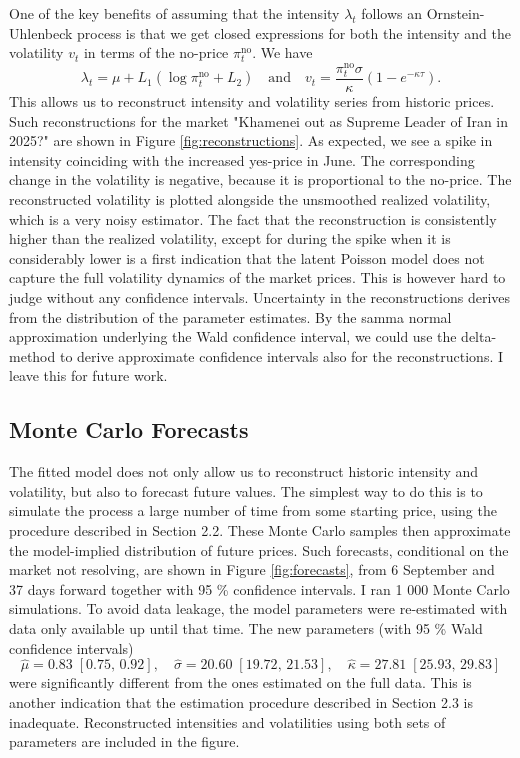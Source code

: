 \documentclass[a4paper, 12pt]{article}
\begin{document}
One of the key benefits of assuming that the intensity \(\lambda_t\) follows an Ornstein-Uhlenbeck process is that we get closed expressions for both the intensity and the volatility \(v_t\) in terms of the no-price \(\pi_t^\text{no}\). We have
\begin{equation*}
   \lambda_t = \mu + L_1(\log\pi_t^\text{no} + L_2)\quad\text{and}\quad v_t = \frac{\pi_t^\text{no} \sigma}{\kappa}(1-e^{-\kappa\tau}).
\end{equation*}
This allows us to reconstruct intensity and volatility series from historic prices. Such reconstructions for the market "Khamenei out as Supreme Leader of Iran in 2025?" are shown in Figure \ref{fig:reconstructions}. As expected, we see a spike in intensity coinciding with the increased yes-price in June. The corresponding change in the volatility is negative, because it is proportional to the no-price. The reconstructed volatility is plotted alongside the unsmoothed realized volatility, which is a very noisy estimator. The fact that the reconstruction is consistently higher than the realized volatility, except for during the spike when it is considerably lower is a first indication that the latent Poisson model does not capture the full volatility dynamics of the market prices. This is however hard to judge without any confidence intervals. Uncertainty in the reconstructions derives from the distribution of the parameter estimates. By the samma normal approximation underlying the Wald confidence interval, we could use the delta-method to derive approximate confidence intervals also for the reconstructions. I leave this for future work.

\subsection{Monte Carlo Forecasts}
The fitted model does not only allow us to reconstruct historic intensity and volatility, but also to forecast future values. The simplest way to do this is to simulate the process a large number of time from some starting price, using the procedure described in Section 2.2. These Monte Carlo samples then approximate the model-implied distribution of future prices. Such forecasts, conditional on the market not resolving, are shown in Figure \ref{fig:forecasts}, from 6 September and 37 days forward together with 95 \% confidence intervals. I ran 1 000 Monte Carlo simulations. To avoid data leakage, the model parameters were re-estimated with data only available up until that time. The new parameters (with 95 \% Wald confidence intervals)
\begin{equation*}
\hat{\mu} = 0.83\;[0.75,\,0.92], \quad
\hat{\sigma} = 20.60\;[19.72,\,21.53], \quad
\hat{\kappa} = 27.81\;[25.93,\,29.83]
\end{equation*}
were significantly different from the ones estimated on the full data. This is another indication that the estimation procedure described in Section 2.3 is inadequate. Reconstructed intensities and volatilities using both sets of parameters are included in the figure.
\end{document}
